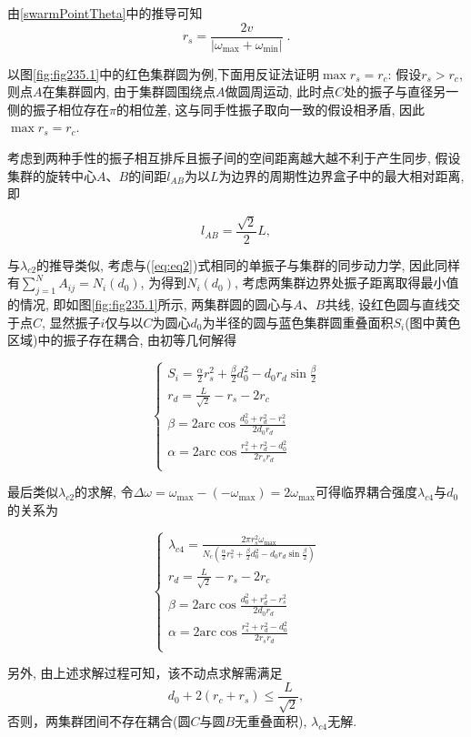 \documentclass{article}
\begin{document}
由\ref{swarmPointTheta}中的推导可知
$$
r_s=\frac{2v}{\left| \omega _{\max}+\omega _{\min} \right|}\; .
$$

以图\ref{fig:fig235.1}中的红色集群圆为例,下面用反证法证明$\max r_s=r_c$: 假设$r_s>r_c$, 则点$A$在集群圆内, 由于集群圆围绕点$A$做圆周运动, 此时点$C$处的振子与直径另一侧的振子相位存在$\pi$的相位差, 这与同手性振子取向一致的假设相矛盾, 因此$\max r_s=r_c$.

考虑到两种手性的振子相互排斥且振子间的空间距离越大越不利于产生同步, 假设集群的旋转中心$A$、$B$的间距$l_{AB}$为以$L$为边界的周期性边界盒子中的最大相对距离, 即

$$
l_{AB}=\frac{\sqrt{2}}{2}L,
$$

与$\lambda_{c2}$的推导类似, 考虑与(\ref{eq:eq2})式相同的单振子与集群的同步动力学, 因此同样有$\sum_{j=1}^N{A_{ij}}=N_i\left( d_0 \right)$, 为得到$N_i\left( d_0 \right)$, 考虑两集群边界处振子距离取得最小值的情况, 即如图\ref{fig:fig235.1}所示, 两集群圆的圆心与$A$、$B$共线, 设红色圆与直线交于点$C$, 显然振子$i$仅与以$C$为圆心$d_0$为半径的圆与蓝色集群圆重叠面积$S_i$(图中黄色区域)中的振子存在耦合, 
由初等几何解得

$$
\begin{cases}
	S_i=\frac{\alpha}{2}r_{s}^{2}+\frac{\beta}{2}d_{0}^{2}-d_0r_d\sin \frac{\beta}{2}\\
	r_d=\frac{L}{\sqrt{2}}-r_s-2r_c\\
	\beta =2\mathrm{arc}\cos \frac{d_{0}^{2}+r_{d}^{2}-r_{s}^{2}}{2d_0r_d}\\
	\alpha =2\mathrm{arc}\cos \frac{r_{s}^{2}+r_{d}^{2}-d_{0}^{2}}{2r_sr_d}\\
\end{cases}
$$

最后类似$\lambda_{c2}$的求解, 令$\Delta \omega =\omega _{\max}-\left( -\omega _{\max} \right) =2\omega _{\max}$可得临界耦合强度$\lambda _{c4}$与$d_0$的关系为

$$
\begin{cases}
	\lambda _{c4}=\frac{2\pi r_{s}^{2}\omega _{\max}}{N_c\left( \frac{\alpha}{2}r_{s}^{2}+\frac{\beta}{2}d_{0}^{2}-d_0r_d\sin \frac{\beta}{2} \right)}\\
	r_d=\frac{L}{\sqrt{2}}-r_s-2r_c\\
	\beta =2\mathrm{arc}\cos \frac{d_{0}^{2}+r_{d}^{2}-r_{s}^{2}}{2d_0r_d}\\
	\alpha =2\mathrm{arc}\cos \frac{r_{s}^{2}+r_{d}^{2}-d_{0}^{2}}{2r_sr_d}\\
\end{cases}
$$

另外, 由上述求解过程可知，该不动点求解需满足
$$
d_0+2\left( r_c+r_s \right) \le \frac{L}{\sqrt{2}}, 
$$
否则，两集群团间不存在耦合(圆$C$与圆$B$无重叠面积), $\lambda _{c4}$无解.
\end{document}

